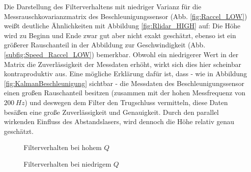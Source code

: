 \documentclass[12pt,a4paper]{article}
\begin{document}
\begin{enumerate}[label=\textbf{\arabic*})]
\begin{enumerate}[label=\textbf{\alph*})]
		Die Darstellung des Filterverhaltens mit niedriger Varianz für die Messrauschkovarianzmatrix des Beschleunigungssensor (Abb. \ref{fig:Raccel_LOW}) weißt deutliche Ähnlichkeiten mit Abbildung \ref{fig:Rlidar_HIGH} auf: Die Höhe wird zu Beginn und Ende zwar gut aber nicht exakt geschätzt, ebenso ist ein größerer Rauschanteil in der Abbildung zur Geschwindigkeit (Abb. \ref{subfig:Speed_Raccel_LOW}) bemerkbar. Obwohl ein niedrigerer Wert in der Matrix die Zuverlässigkeit der Messdaten erhöht, wirkt sich dies hier scheinbar kontraproduktiv aus. Eine mögliche Erklärung dafür ist, dass - wie in Abbildung \ref{fig:KalmanBeschleunigung} sichtbar - die Messdaten des Beschleunigungssensor einen großen Rauschanteil besitzen (zusammen mit der hohen Messfrequenz von $200~Hz$) und deswegen dem Filter den Trugschluss vermitteln, diese Daten besäßen eine große Zuverlässigkeit und Genauigkeit. Durch den parallel wirkenden Einfluss des Abstandslasers, wird dennoch die Höhe relativ genau geschätzt.\\
		\begin{figure}[!ht]
			\hfill
			\caption{Filterverhalten bei hohem $Q$}
			\label{fig:Q_HIGH}
		\end{figure}
		\begin{figure}[!ht]
			\hfill	
			\caption{Filterverhalten bei niedrigem $Q$}
			\label{fig:Q_LOW}
		\end{figure}
	

\end{enumerate}
\end{enumerate}
\end{document}
